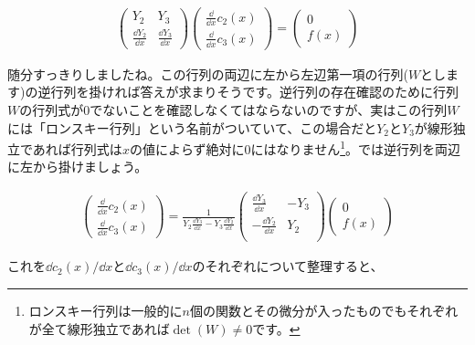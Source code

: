 \begin{eqnarray}
    \left(
        \begin{array}{cc}
            Y_2 & Y_3 \\
            \frac{\dd Y_2}{\dd x} & \frac{\dd Y_3}{\dd x}
        \end{array}
    \right)
    \left(
        \begin{array}{c}
            \frac{\dd}{\dd x}c_2(x) \\
            \frac{\dd}{\dd x}c_3(x)
        \end{array}
    \right)
    =
    \left(
        \begin{array}{c}
            0 \\
            f(x)
        \end{array}
    \right)
\end{eqnarray}

随分すっきりしましたね。この行列の両辺に左から左辺第一項の行列($W$とします)の逆行列を掛ければ答えが求まりそうです。逆行列の存在確認のために行列$W$の行列式が0でないことを確認しなくてはならないのですが、実はこの行列$W$には「ロンスキー行列」という名前がついていて、この場合だと$Y_2$と$Y_3$が線形独立であれば行列式は$x$の値によらず絶対に0にはなりません\footnote{ロンスキー行列は一般的に$n$個の関数とその微分が入ったものでもそれぞれが全て線形独立であれば$\det(W)\neq0$です。}。では逆行列を両辺に左から掛けましょう。

\begin{eqnarray}
    \left(
        \begin{array}{c}
            \frac{\dd}{\dd x}c_2(x) \\
            \frac{\dd}{\dd x}c_3(x)
        \end{array}
    \right)
    =
    \frac{1}{Y_2\frac{\dd Y_3}{\dd x}-Y_3\frac{\dd Y_2}{\dd x}}
    \left(
        \begin{array}{cc}
            \frac{\dd Y_3}{\dd x} &-Y_3 \\
            -\frac{\dd Y_2}{\dd x} &Y_2 \\
        \end{array}
    \right)
    \left(
        \begin{array}{c}
            0 \\
            f(x)
        \end{array}
    \right)
\end{eqnarray}

これを$\dd c_2(x)/\dd x$と$\dd c_3(x)/\dd x$のそれぞれについて整理すると、

